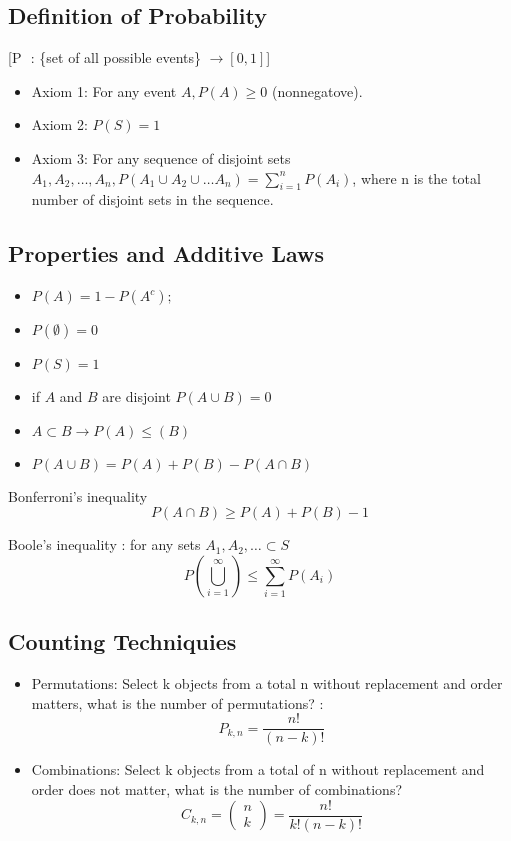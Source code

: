 \documentclass[12pt]{article}
\begin{document}
\subsection*{Definition of Probability \cite[p.4]{classnotes.2}}
[P \(\) : \{set of all possible events\} $\rightarrow [0,1]$]
\begin{itemize}

\item Axiom 1: For any event $A, P(A)\geq 0$ (nonnegatove).
\item Axiom 2: $P(S)=1$
\item Axiom 3: For any sequence of disjoint sets $A_1,A_2,\dots,A_n, P(A_1 \cup A_2 \cup \dots A_n)=\sum\limits_{i=1}^nP(A_i)$, where n is the total number of disjoint sets in the sequence.

\end {itemize}

\subsection*{Properties and Additive Laws \cite[p.5]{classnotes.2}}
\begin{itemize}
\item $P(A)=1-P(A^c);$
\item $P(\emptyset)=0$
\item $P(S)=1$
\item if $A$ and $B$ are disjoint $P(A\cup B)=0$
\item $A\subset B \rightarrow P(A)\leq (B)$
\item $P(A \cup B) = P(A) + P(B) - P(A \cap B)$
\end{itemize}

Bonferroni's inequality \cite[p.6]{classnotes.2}
$$P(A\cap B) \geq P(A) + P(B) - 1$$

Boole's inequality \cite[p.5]{classnotes.2}: for any sets $A_1, A_2, \dots \subset S$
$$P(\bigcup\limits_{i=1}^\infty)\leq \sum\limits_{i=1}^\infty P(A_i)$$

\subsection*{Counting Techniquies}

\begin{itemize}
\item Permutations: Select k objects from a total n without replacement and order matters, what is the number of permutations? \cite[p.9]{classnotes.2}:
$$P_{k,n} = \frac{n!}{(n-k)!}$$
\item Combinations: Select k objects from a total of n without replacement and order does not matter, what is the number of combinations? \cite[p.10]{classnotes.2}
$$C_{k,n}=
\begin{pmatrix}
n \\
k
\end{pmatrix}
=\frac{n!}{k!(n-k)!}
$$
\end{itemize}
\end{document}
